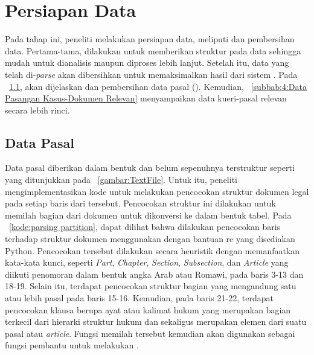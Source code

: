 \section{Persiapan Data}
\label{subbab:4:Persiapan Data}
Pada tahap ini, peneliti melakukan persiapan data, meliputi \parsing{} dan pembersihan data. Pertama-tama, \parsing{} dilakukan untuk memberikan struktur pada data sehingga mudah untuk dianalisis maupun diproses lebih lanjut. Setelah itu, data yang telah di-\textit{parse} akan dibersihkan untuk memaksimalkan hasil dari sistem \ir{}. Pada \subbab{}~\ref{subbab:4:Data Pasal}, akan dijelaskan \parsing{} dan pembersihan data pasal (\corpus{}). Kemudian, \subbab{}~\ref{subbab:4:Data Pasangan Kasus-Dokumen Relevan} menyampaikan \parsing{} data kueri-pasal relevan secara lebih rinci.
\subsection{Data Pasal}
\label{subbab:4:Data Pasal}
Data pasal diberikan dalam bentuk \txt{} \file{} dan belum sepenuhnya terstruktur seperti yang ditunjukkan pada \gambar{}~\ref{gambar:TextFile}. Untuk itu, peneliti mengimplementasikan kode untuk melakukan pencocokan struktur dokumen legal pada setiap baris dari \file{} tersebut. Pencocokan struktur ini dilakukan untuk memilah bagian dari dokumen untuk dikonversi ke dalam bentuk tabel. Pada \kode{}~\ref{kode:parsing partition}, dapat dilihat bahwa dilakukan pencocokan baris terhadap struktur dokumen menggunakan \regex{} dengan bantuan \library{} re yang disediakan Python. Pencocokan tersebut dilakukan secara heuristik dengan memanfaatkan kata-kata kunci, seperti \textit{Part}, \textit{Chapter}, \textit{Section}, \textit{Subsection}, dan \textit{Article} yang diikuti penomoran dalam bentuk angka Arab atau Romawi, pada baris 3-13 dan 18-19. Selain itu, terdapat pencocokan struktur bagian yang mengandung satu atau lebih pasal pada baris 15-16. Kemudian, pada baris 21-22, terdapat pencocokan klausa berupa ayat atau kalimat hukum yang merupakan bagian terkecil dari hierarki struktur hukum dan sekaligus merupakan elemen dari suatu pasal atau \textit{article}. Fungsi memilah tersebut kemudian akan digunakan sebagai fungsi pembantu untuk melakukan \parsing{}.


